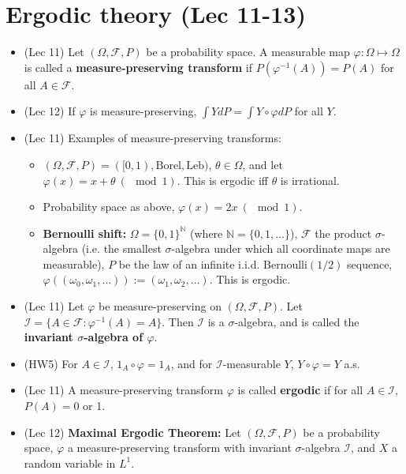 \documentclass[twoside]{article}
\newcommand{\dis}{\displaystyle}
\newcommand\bbN{\mathbb{N}}
\newcommand\calF{\mathcal{F}}
\newcommand\om{\omega}
\newcommand\Om{\Omega}
\newcommand\sg{\sigma}
\def\t{\theta}
\newcommand\vp{\varphi}
\begin{document}
\section*{Ergodic theory (Lec 11-13)}
\begin{itemize}
\item (Lec 11) Let $(\Om, \calF, P)$ be a probability space. A measurable map $\varphi: \Om \mapsto \Om$ is called a \textbf{measure-preserving transform} if $P (\varphi^{-1}(A)) = P(A)$ for all $A \in \calF$.

\item (Lec 12) If $\vp$ is measure-preserving, $\dis\int Y dP = \int Y \circ \vp dP$ for all $Y$.

\item (Lec 11) Examples of measure-preserving transforms:
\begin{itemize}
\item $(\Om, \calF, P) = ([0, 1), \text{Borel}, \text{Leb})$, $\t \in \Om$, and let $\varphi(x) = x + \t \:(\mod 1)$. This is ergodic iff $\t$ is irrational.

\item Probability space as above, $\varphi(x) = 2x \:(\mod 1)$.

\item \textbf{Bernoulli shift:} $\Om = \{ 0, 1\}^\bbN$ (where $\bbN = \{ 0, 1, \dots \}$), $\calF$ the product $\sg$-algebra (i.e. the smallest $\sg$-algebra under which all coordinate maps are measurable), $P$ be the law of an infinite i.i.d. $\text{Bernoulli}(1/2)$ sequence, $\varphi((\om_0, \om_1, \dots)) := (\om_1, \om_2, \dots)$. This is ergodic.
\end{itemize}

\item (Lec 11) Let $\varphi$ be measure-preserving on $(\Om, \calF, P)$. Let $\mathcal{I} = \{ A \in \calF: \varphi^{-1}(A) = A \}$. Then $\mathcal{I}$ is a $\sg$-algebra, and is called the \textbf{invariant $\sg$-algebra of $\varphi$}.

\item (HW5) For $A \in \mathcal{I}$, $1_A \circ \varphi = 1_A$, and for $\mathcal{I}$-measurable $Y$, $Y \circ \vp = Y$ a.s.

\item (Lec 11) A measure-preserving transform $\varphi$ is called \textbf{ergodic} if for all $A \in \mathcal{I}$, $P(A) = 0$ or 1.

\item (Lec 12) \textbf{Maximal Ergodic Theorem:} Let $(\Om, \calF, P)$ be a probability space, $\vp$ a measure-preserving transform with invariant $\sg$-algebra $\mathcal{I}$, and $X$ a random variable in $L^1$.


\end{itemize}
\end{document}
